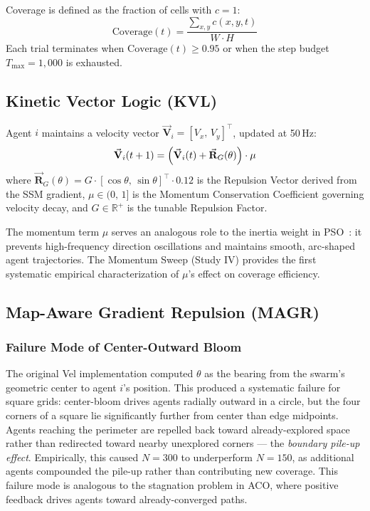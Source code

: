 \documentclass[journal,compsoc]{IEEEtran}
\newcommand{\vecc}[1]{\vec{\mathbf{#1}}}
\begin{document}
Coverage is defined as the fraction of cells with $c=1$:
\begin{equation}
    \text{Coverage}(t) = \frac{\sum_{x,y} c(x,y,t)}{W \cdot H}
\end{equation}
Each trial terminates when $\text{Coverage}(t) \geq 0.95$ or when the step budget
$T_{\max}=1{,}000$ is exhausted.

\subsection{Kinetic Vector Logic (KVL)}

Agent $i$ maintains a velocity vector $\vecc{V}_i = [V_x,\,V_y]^\top$, updated at
50\,Hz:
\begin{equation}
    \vecc{V}_{i}(t+1) = \Bigl(\vecc{V}_{i}(t) + \vecc{R}_G(\theta)\Bigr)\cdot\mu
    \label{eq:kvl}
\end{equation}
where $\vecc{R}_G(\theta) = G\cdot[\cos\theta,\,\sin\theta]^\top\cdot 0.12$ is the
Repulsion Vector derived from the SSM gradient, $\mu \in (0,\,1]$ is the Momentum
Conservation Coefficient governing velocity decay, and $G \in \mathbb{R}^+$ is the
tunable Repulsion Factor.

The momentum term $\mu$ serves an analogous role to the inertia weight in PSO~\cite{kennedy1995}:
it prevents high-frequency direction oscillations and maintains smooth, arc-shaped
agent trajectories. The Momentum Sweep (Study IV) provides the first systematic
empirical characterization of $\mu$'s effect on coverage efficiency.

\subsection{Map-Aware Gradient Repulsion (MAGR)}

\subsubsection{Failure Mode of Center-Outward Bloom}
The original Vel implementation computed $\theta$ as the bearing from the swarm's
geometric center to agent $i$'s position. This produced a systematic failure for
square grids: center-bloom drives agents radially outward in a circle, but the four
corners of a square lie significantly further from center than edge midpoints. Agents
reaching the perimeter are repelled back toward already-explored space rather than
redirected toward nearby unexplored corners --- the \textit{boundary pile-up effect}.
Empirically, this caused $N=300$ to underperform $N=150$, as additional agents
compounded the pile-up rather than contributing new coverage. This failure mode is
analogous to the stagnation problem in ACO, where positive feedback drives agents
toward already-converged paths.
\end{document}

